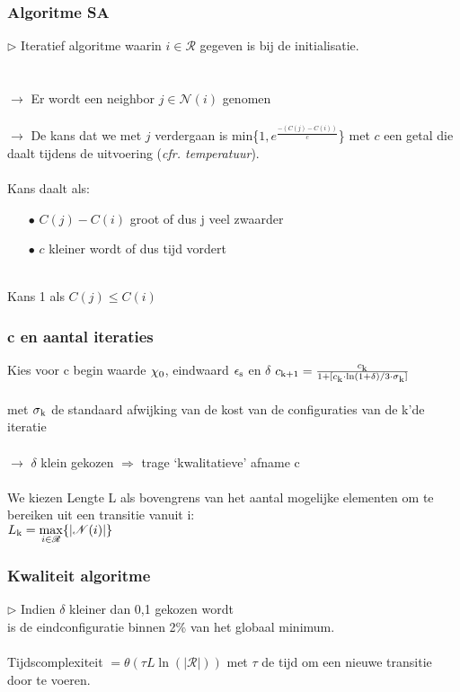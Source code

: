 \documentclass
   [kulak] %
   {kulakbeamer}
\begin{document}
\begin{frame}
	\frametitle{Algoritme SA}
	$\triangleright$ Iteratief algoritme waarin $i \in \mathscr{R}$ gegeven is bij de initialisatie. \\~\\~\\ \pause
	$\rightarrow$ Er wordt een neighbor $j \in \mathscr{N}(i)$ genomen \\~\\ \pause
	$\rightarrow$ De kans dat we met $j$ verdergaan is min\{$1,e^{\frac{-(C(j)-C(i))}{c}}$\} met $c$ een getal die daalt tijdens de uitvoering (\textit{cfr. temperatuur}).\\~\\
	\pause
	Kans daalt als:
	\begin{itemize}
		\item[$\bullet$] $C(j)-C(i)$ groot of dus j veel zwaarder
		
		\item[$\bullet$] $c$ kleiner wordt of dus tijd vordert
		
		
	\end{itemize}
	\pause
	~\\Kans 1 als $C(j) \leqslant C(i)$
	
	
\end{frame}

\begin{frame}
	\frametitle{c en aantal iteraties}
	Kies voor c begin waarde $\chi\textsubscript{0}$, eindwaard $\epsilon\textsubscript{s}$ en $\delta$
	$c\textsubscript{k+1} = \frac{c\textsubscript{k}}{1 + [c\textsubscript{k}\cdot \ln(1 + \delta)/3\cdot \sigma\textsubscript{k}]}$ \\~\\ met $\sigma\textsubscript{k}$ de standaard afwijking van de kost van de configuraties van de k'de iteratie \\~\\\pause$\rightarrow$ $\delta$ klein gekozen $\Rightarrow$ trage `kwalitatieve' afname c 
	\\~\\\pause
	We kiezen Lengte L als bovengrens van het aantal mogelijke elementen om te bereiken uit een transitie vanuit i:\\
	$L\textsubscript{k} = \displaystyle \max_{i \in \mathscr{R}}\{|\mathscr{N}(i)|\}$
\end{frame}

\begin{frame}
	\frametitle{Kwaliteit algoritme}
	
	$\triangleright$ Indien $\delta$ kleiner dan 0,1 gekozen wordt\\
	is de eindconfiguratie binnen 2\% van het globaal minimum. \\~\\
	Tijdscomplexiteit $= \mathscr{\theta}(\tau L\ln(|\mathscr{R}|))$ met $\tau$ de tijd om een nieuwe transitie door te voeren.
	
\end{frame}
\end{document}
